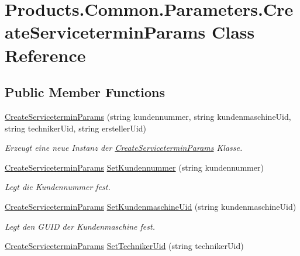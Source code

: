 \hypertarget{class_products_1_1_common_1_1_parameters_1_1_create_servicetermin_params}{}\section{Products.\+Common.\+Parameters.\+Create\+Servicetermin\+Params Class Reference}
\label{class_products_1_1_common_1_1_parameters_1_1_create_servicetermin_params}
\subsection*{Public Member Functions}
\begin{DoxyCompactItemize}
\item 
\hyperlink{class_products_1_1_common_1_1_parameters_1_1_create_servicetermin_params_a4f135e8727a8f390e260aac9bc4a2380}{Create\+Servicetermin\+Params} (string kundennummer, string kundenmaschine\+Uid, string techniker\+Uid, string ersteller\+Uid)
\begin{DoxyCompactList}\small\item\em Erzeugt eine neue Instanz der \hyperlink{class_products_1_1_common_1_1_parameters_1_1_create_servicetermin_params}{Create\+Servicetermin\+Params} Klasse. \end{DoxyCompactList}\item 
\hyperlink{class_products_1_1_common_1_1_parameters_1_1_create_servicetermin_params}{Create\+Servicetermin\+Params} \hyperlink{class_products_1_1_common_1_1_parameters_1_1_create_servicetermin_params_ab4434043e80e0434e701431323af3dc2}{Set\+Kundennummer} (string kundennummer)
\begin{DoxyCompactList}\small\item\em Legt die Kundennummer fest. \end{DoxyCompactList}\item 
\hyperlink{class_products_1_1_common_1_1_parameters_1_1_create_servicetermin_params}{Create\+Servicetermin\+Params} \hyperlink{class_products_1_1_common_1_1_parameters_1_1_create_servicetermin_params_a9bfc630e238c15411a94da0ed1de5f08}{Set\+Kundenmaschine\+Uid} (string kundenmaschine\+Uid)
\begin{DoxyCompactList}\small\item\em Legt den G\+U\+ID der Kundenmaschine fest. \end{DoxyCompactList}\item 
\hyperlink{class_products_1_1_common_1_1_parameters_1_1_create_servicetermin_params}{Create\+Servicetermin\+Params} \hyperlink{class_products_1_1_common_1_1_parameters_1_1_create_servicetermin_params_ae7fb4d43a588e5711f1b279a6b4284b7}{Set\+Techniker\+Uid} (string techniker\+Uid)

\end{DoxyCompactItemize}
